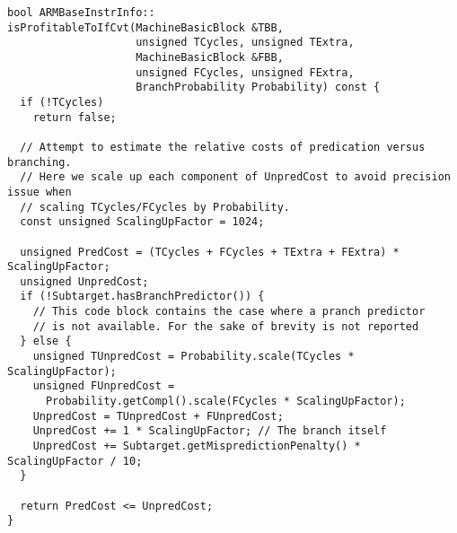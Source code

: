 \begin{lstlisting}[style=CStyle]
bool ARMBaseInstrInfo::
isProfitableToIfCvt(MachineBasicBlock &TBB,
                    unsigned TCycles, unsigned TExtra,
                    MachineBasicBlock &FBB,
                    unsigned FCycles, unsigned FExtra,
                    BranchProbability Probability) const {
  if (!TCycles)
    return false;

  // Attempt to estimate the relative costs of predication versus branching.
  // Here we scale up each component of UnpredCost to avoid precision issue when
  // scaling TCycles/FCycles by Probability.
  const unsigned ScalingUpFactor = 1024;

  unsigned PredCost = (TCycles + FCycles + TExtra + FExtra) * ScalingUpFactor;
  unsigned UnpredCost;
  if (!Subtarget.hasBranchPredictor()) {
    // This code block contains the case where a pranch predictor
    // is not available. For the sake of brevity is not reported
  } else {
    unsigned TUnpredCost = Probability.scale(TCycles * ScalingUpFactor);
    unsigned FUnpredCost =
      Probability.getCompl().scale(FCycles * ScalingUpFactor);
    UnpredCost = TUnpredCost + FUnpredCost;
    UnpredCost += 1 * ScalingUpFactor; // The branch itself
    UnpredCost += Subtarget.getMispredictionPenalty() * ScalingUpFactor / 10;
  }

  return PredCost <= UnpredCost;
}
\end{lstlisting}